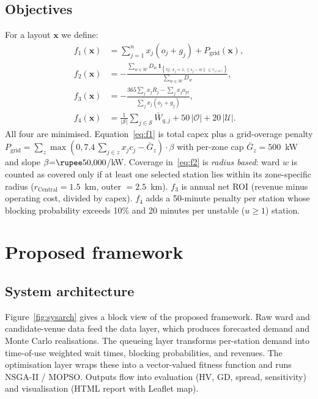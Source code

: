 \documentclass[conference]{IEEEtran}
\begin{document}
\subsection{Objectives}
\label{subsec:objectives}
For a layout $\mathbf{x}$ we define:
\begin{align}
f_{1}(\mathbf{x})&= \sum_{j=1}^{n}x_{j}(o_{j}+g_{j})+P_{\text{grid}}(\mathbf{x}), \label{eq:f1}\\
f_{2}(\mathbf{x})&= -\frac{\sum_{w\in\mathcal{W}}D_{w}\,\mathbf{1}_{\left\{\exists j:\,x_{j}=1,\|s_{j}-w\|\le r_{z(w)}\right\}}}{\sum_{w\in\mathcal{W}}D_{w}}, \label{eq:f2}\\
f_{3}(\mathbf{x})&= -\frac{365\sum_{j}x_{j}R_{j}-\sum_{j}x_{j}o_{\text{yr}}}{\sum_{j}x_{j}(o_{j}+g_{j})}, \label{eq:f3}\\
f_{4}(\mathbf{x})&= \frac{1}{|\mathcal{S}|}\sum_{j\in\mathcal{S}}\bar W_{q,j}
                  +50\,\lvert\mathcal{O}\rvert+20\,\lvert\mathcal{U}\rvert. \label{eq:f4}
\end{align}
All four are minimised. Equation~\eqref{eq:f1} is total capex plus a
grid-overage penalty $P_{\text{grid}}=\!\!\!\sum_{z}\!\max(0,
7.4\,\sum_{j\in z}x_{j}c_{j}-\bar G_{z})\cdot\beta$ with per-zone cap
$\bar G_{z}=500$~kW and slope $\beta{=}\text{\rupee}50{,}000$/kW. Coverage
in~\eqref{eq:f2} is \emph{radius based}: ward $w$ is counted as covered
only if at least one selected station lies within its zone-specific
radius ($r_{\text{Central}}{=}1.5$~km, outer $=2.5$~km).
$f_{3}$ is annual net ROI (revenue minus operating cost, divided by
capex). $f_{4}$ adds a 50-minute penalty per station whose blocking
probability exceeds 10\% and 20 minutes per unstable
($u\ge1$) station.

\section{Proposed framework}
\label{sec:method}

\subsection{System architecture}
\label{subsec:sysarch}
Figure~\ref{fig:sysarch} gives a block view of the proposed
framework. Raw ward and candidate-venue data feed the data layer,
which produces forecasted demand and Monte Carlo realisations. The
queueing layer transforms per-station demand into time-of-use
weighted wait times, blocking probabilities, and revenues. The
optimisation layer wraps these into a vector-valued fitness function
and runs NSGA-II / MOPSO. Outputs flow into evaluation (HV, GD,
spread, sensitivity) and visualisation (HTML report with Leaflet
map).
\end{document}
